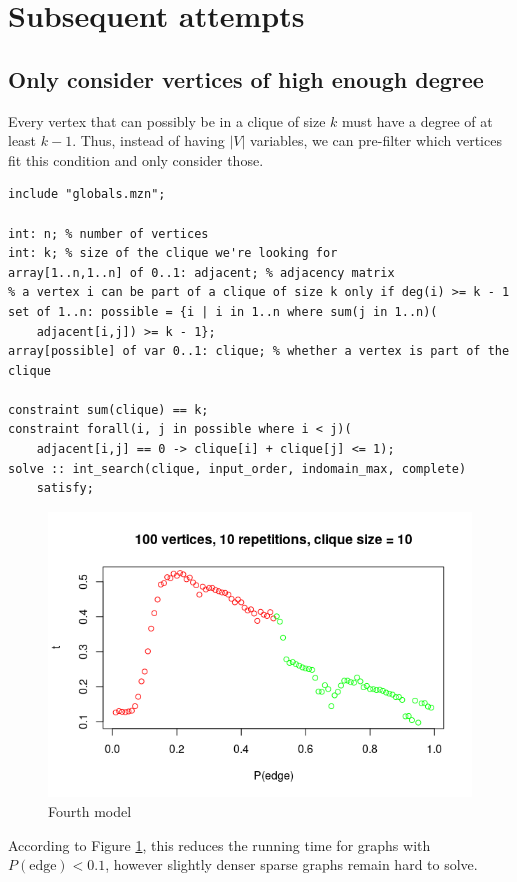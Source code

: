 \documentclass{article}
\theoremstyle{definition}
\begin{document}
\section{Subsequent attempts}
\subsection{Only consider vertices of high enough degree}
Every vertex that can possibly be in a clique of size $k$ must have a degree of at least $k-1$. Thus, instead of having $|V|$ variables, we can pre-filter which vertices fit this condition and only consider those.
\begin{lstlisting}
include "globals.mzn";

int: n; % number of vertices
int: k; % size of the clique we're looking for
array[1..n,1..n] of 0..1: adjacent; % adjacency matrix
% a vertex i can be part of a clique of size k only if deg(i) >= k - 1
set of 1..n: possible = {i | i in 1..n where sum(j in 1..n)(
    adjacent[i,j]) >= k - 1};
array[possible] of var 0..1: clique; % whether a vertex is part of the clique

constraint sum(clique) == k;
constraint forall(i, j in possible where i < j)(
    adjacent[i,j] == 0 -> clique[i] + clique[j] <= 1);
solve :: int_search(clique, input_order, indomain_max, complete)
    satisfy;
\end{lstlisting}
\begin{figure}
  \includegraphics[scale=0.5]{max_clique4.png}
  \caption{Fourth model}
  \label{fig:fourth_max_clique}
\end{figure}
According to Figure \ref{fig:fourth_max_clique}, this reduces the running time for graphs with $P(\text{edge}) < 0.1$, however slightly denser sparse graphs remain hard to solve.
\end{document}
